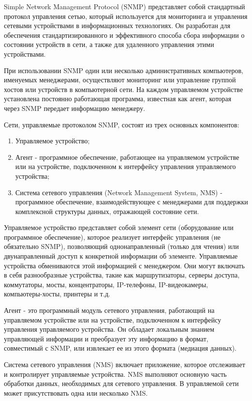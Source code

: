 Simple Network Management Protocol (SNMP) представляет собой стандартный протокол управления сетью\cite{Mauro2005},
который используется для мониторинга и управления сетевыми устройствами в информационных технологиях.
Он разработан для обеспечения стандартизированного и эффективного способа сбора информации о состоянии
устройств в сети, а также для удаленного управления этими устройствами.


При использовании SNMP один или несколько административных компьютеров, именуемых менеджерами, осуществляют мониторинг или управление группой хостов или устройств в компьютерной сети. На каждом управляемом устройстве установлена постоянно работающая программа, известная как агент, которая через SNMP передает информацию менеджеру.

Сети, управляемые протоколом SNMP, состоят из трех основных компонентов\cite{snmp}:

\begin{enumerate}
    \item Управляемое устройство;
    \item Агент - программное обеспечение, работающее на управляемом устройстве или на устройстве, подключенном к интерфейсу управления управляемого устройства;
    \item Система сетевого управления (Network Management System, NMS) - программное обеспечение, взаимодействующее с менеджерами для поддержки комплексной структуры данных, отражающей состояние сети.
\end{enumerate}

Управляемое устройство представляет собой элемент сети (оборудование или программное обеспечение), которое реализует интерфейс управления (не обязательно SNMP), позволяющий однонаправленный (только для чтения) или двунаправленный доступ к конкретной информации об элементе. Управляемые устройства обмениваются этой информацией с менеджером. Они могут включать в себя разнообразные устройства, такие как маршрутизаторы, серверы доступа, коммутаторы, мосты, концентраторы, IP-телефоны, IP-видеокамеры, компьютеры-хосты, принтеры и т.д.

Агент - это программный модуль сетевого управления, работающий на управляемом устройстве или на устройстве, подключенном к интерфейсу управления управляемого устройства. Он обладает локальным знанием управляющей информации и преобразует эту информацию в формат, совместимый с SNMP, или извлекает ее из этого формата (медиация данных).

Система сетевого управления (NMS) включает приложение, которое отслеживает и контролирует управляемые устройства. NMS выполняют основную часть обработки данных, необходимых для сетевого управления. В управляемой сети может присутствовать одна или несколько NMS.

